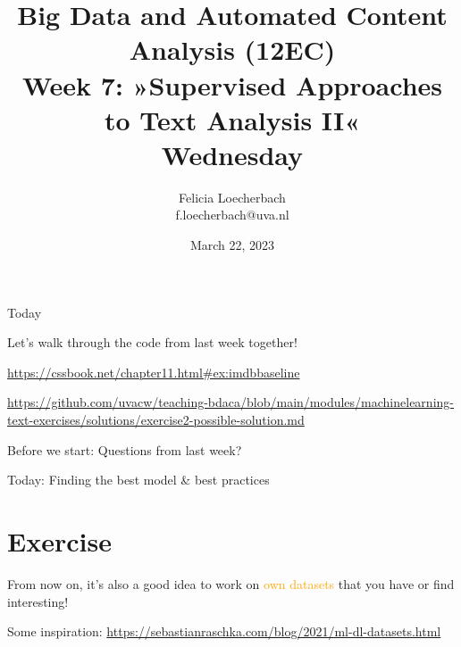 

\graphicspath{{../../resources/img/}}




\title[Big Data and Automated Content Analysis]{\textbf{Big Data and Automated Content Analysis (12EC)} 
\\Week 7: »Supervised Approaches to Text Analysis II«
\\Wednesday}
\author[Felicia Loecherbach]{Felicia Loecherbach\\ \footnotesize{f.loecherbach@uva.nl\\}}
\date{March 22, 2023}


\begin{frame}{}
	\titlepage
\end{frame}

\begin{frame}{Today}
	\tableofcontents
\end{frame}


\begin{frame}[standout]
Let's walk through the code from last week together!

\url{https://cssbook.net/chapter11.html\#ex:imdbbaseline}

\url{https://github.com/uvacw/teaching-bdaca/blob/main/modules/machinelearning-text-exercises/solutions/exercise2-possible-solution.md}


\end{frame}



\begin{frame}[standout]
Before we start: Questions from last week?
\end{frame}


\begin{frame}[standout]
Today: Finding the best model \& best practices
\end{frame}









\section{Exercise}

\begin{frame}[standout]
From now on, it's also a good idea to work on \textcolor{orange}{own datasets} that you have or find interesting!

Some inspiration: \url{https://sebastianraschka.com/blog/2021/ml-dl-datasets.html}

\end{frame}





